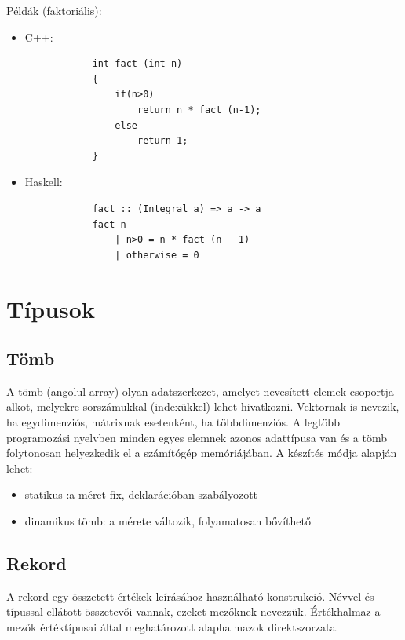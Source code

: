 \documentclass[margin=0px]{article}
\begin{document}
	\noindent Példák (faktoriális):
	
	\begin{itemize}
		\item	C++:
		\begin{verbatim}
			int fact (int n)
			{
			    if(n>0)
			        return n * fact (n-1);
			    else
			        return 1;
			}
		\end{verbatim}
		
		\item	Haskell:
		\begin{verbatim}
			fact :: (Integral a) => a -> a  
			fact n
			    | n>0 = n * fact (n - 1)  
			    | otherwise = 0
		\end{verbatim}
	
	\end{itemize}
	
	
	
	\section{Típusok}
	
	\subsection{Tömb}
	
	A tömb (angolul array) olyan adatszerkezet, amelyet nevesített elemek csoportja alkot, melyekre sorszámukkal (indexükkel) lehet hivatkozni. Vektornak is nevezik, ha egydimenziós, mátrixnak esetenként, ha többdimenziós. A legtöbb programozási nyelvben minden egyes elemnek azonos adattípusa van és a tömb folytonosan helyezkedik el a számítógép memóriájában. A készítés módja alapján lehet:
	
	\begin{itemize}
		\item	statikus :a méret fix, deklarációban szabályozott
		\item	dinamikus tömb: a mérete változik, folyamatosan bővíthető
	\end{itemize}

	\subsection{Rekord}
	
	A rekord egy összetett értékek leírásához használható konstrukció. Névvel és típussal ellátott összetevői vannak, ezeket mezőknek nevezzük.
	Értékhalmaz a mezők értéktípusai által meghatározott alaphalmazok direktszorzata.
	
\end{document}
